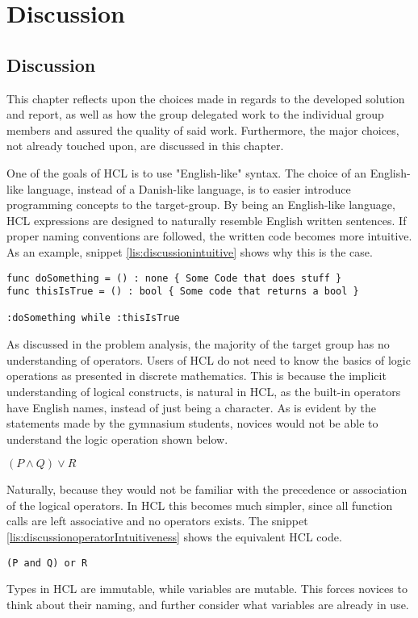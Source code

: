 \chapter{Discussion}
\section{Discussion}
This chapter reflects upon the choices made in regards to the developed solution and report, as well as how the group delegated work to the individual group members and assured the quality of said work.
Furthermore, the major choices, not already touched upon, are discussed in this chapter.

One of the goals of HCL is to use "English-like" syntax.
The choice of an English-like language, instead of a Danish-like language, is to easier introduce programming concepts to the target-group.
By being an English-like language, HCL expressions are designed to naturally resemble English written sentences.
If proper naming conventions are followed, the written code becomes more intuitive.
As an example, snippet \ref{lis:discussionintuitive} shows why this is the case.

\begin{lstlisting}[language=HCL,label=lis:discussionintuitive,firstnumber=1,caption=Example of the intuitive nature of HCL]
func doSomething = () : none { Some Code that does stuff }
func thisIsTrue = () : bool { Some code that returns a bool }

:doSomething while :thisIsTrue
\end{lstlisting}

As discussed in the problem analysis, the majority of the target group has no understanding of operators.
Users of HCL do not need to know the basics of logic operations as presented in discrete mathematics.
This is because the implicit understanding of logical constructs, is natural in HCL, as the built-in operators have English names, instead of just being a character.
As is evident by the statements made by the gymnasium students, novices would not be able to understand the logic operation shown below.
\begin{center}
	$(P \wedge Q) \vee R$
\end{center}
Naturally, because they would not be familiar with the precedence or association of the logical operators.
In HCL this becomes much simpler, since all function calls are left associative and no operators exists.
The snippet \ref{lis:discussionoperatorIntuitiveness} shows the equivalent HCL code.
\begin{lstlisting}[language=HCL,label=lis:discussionoperatorIntuitiveness,firstnumber=1,caption=Example of the intuitive nature of HCL]
(P and Q) or R
\end{lstlisting}
Types in HCL are immutable, while variables are mutable.
This forces novices to think about their naming, and further consider what variables are already in use.

